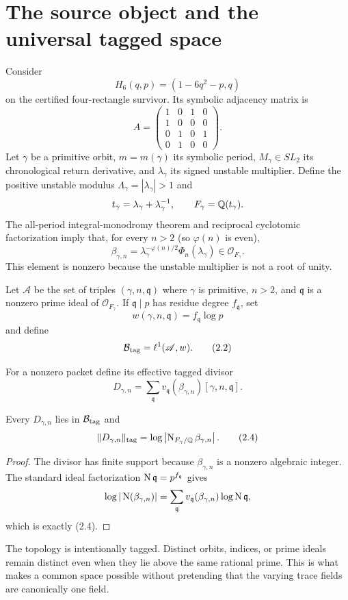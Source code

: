 \section{The source object and the universal tagged space}

Consider
\[
H_6(q,p)=(1-6q^2-p,q)
\]
on the certified four-rectangle survivor.  Its symbolic adjacency matrix is
\[
A=\begin{pmatrix}
1&0&1&0\\
1&0&0&0\\
0&1&0&1\\
0&1&0&0
\end{pmatrix}.
\]
Let $\gamma$ be a primitive orbit, $m=m(\gamma)$ its symbolic period,
$M_\gamma\in SL_2$ its chronological return derivative, and
$\lambda_\gamma$ its signed unstable multiplier.  Define the positive
unstable modulus $\Lambda_\gamma=|\lambda_\gamma|>1$ and
\[
t_\gamma=\lambda_\gamma+\lambda_\gamma^{-1},
\qquad F_\gamma=\mathbb Q(t_\gamma).
\]
The all-period integral-monodromy theorem and reciprocal cyclotomic
factorization imply that, for every $n>2$ (so $\varphi(n)$ is even),
\[
\beta_{\gamma,n}
=\lambda_\gamma^{-\varphi(n)/2}\Phi_n(\lambda_\gamma)
\in\mathcal O_{F_\gamma}.
\tag{2.1}
\]
This element is nonzero because the unstable multiplier is not a root of
unity.

\begin{definition}
Let $\mathscr A$ be the set of triples
$(\gamma,n,\mathfrak q)$ where $\gamma$ is primitive, $n>2$, and
$\mathfrak q$ is a nonzero prime ideal of $\mathcal O_{F_\gamma}$.  If
$\mathfrak q\mid p$ has residue degree $f_{\mathfrak q}$, set
\[
w(\gamma,n,\mathfrak q)=f_{\mathfrak q}\log p
\]
and define
\[
\mathcal B_{\mathrm{tag}}=\ell^1(\mathscr A,w).
\tag{2.2}
\]
\end{definition}

For a nonzero packet define its effective tagged divisor
\[
D_{\gamma,n}
=\sum_{\mathfrak q}
v_{\mathfrak q}(\beta_{\gamma,n})[\gamma,n,\mathfrak q].
\tag{2.3}
\]

\begin{proposition}\label{prop:packet-norm}
Every $D_{\gamma,n}$ lies in $\mathcal B_{\mathrm{tag}}$ and
\[
\|D_{\gamma,n}\|_{\rm tag}
=\log\left|\operatorname{N}_{F_\gamma/\mathbb Q}\beta_{\gamma,n}\right|.
\tag{2.4}
\]
\end{proposition}

\begin{proof}
The divisor has finite support because $\beta_{\gamma,n}$ is a nonzero
algebraic integer.  The standard ideal factorization
$\operatorname{N}\mathfrak q=p^{f_{\mathfrak q}}$ gives
\[
\log|\operatorname{N}(\beta_{\gamma,n})|
=\sum_{\mathfrak q}v_{\mathfrak q}(\beta_{\gamma,n})
\log\operatorname{N}\mathfrak q,
\]
which is exactly (2.4).
\end{proof}

The topology is intentionally tagged.  Distinct orbits, indices, or prime
ideals remain distinct even when they lie above the same rational prime.
This is what makes a common space possible without pretending that the
varying trace fields are canonically one field.
